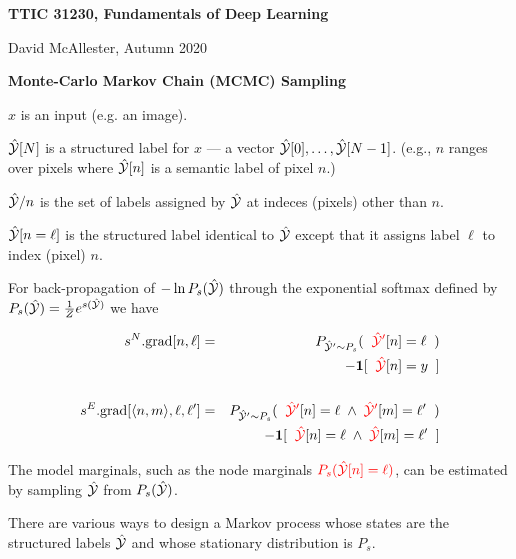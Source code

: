 




{\Huge

  \centerline{\bf TTIC 31230, Fundamentals of Deep Learning}
  \bigskip
  \centerline{David McAllester, Autumn 2020}
  \vfill
  \vfill
  \centerline{\bf Monte-Carlo Markov Chain (MCMC) Sampling}
\vfill
\vfill
\vfill


$x$ is an input (e.g. an image).

\vfill
$\hat{\cal Y} [N]$ is a structured label for $x$ --- a vector $\hat{\cal Y}[0],\ldots,\hat{\cal Y}[N-1]$. (e.g., $n$ ranges over pixels where $\hat{\cal Y}[n]$ is a semantic label of pixel $n$.)

\vfill
$\hat{\cal Y}/n$ is the set of labels assigned by $\hat{\cal Y}$ at indeces (pixels) other than $n$.

\vfill
$\hat{\cal Y}[n=\ell]$ is the structured label identical to $\hat{\cal Y}$ except that it assigns label $\ell$ to index (pixel) $n$.


For back-propagation of $- \ln P_s(\hat{\cal Y})$ through the exponential softmax defined by $P_s(\hat{\cal Y}) = \frac{1}{Z} e^{s(\hat{\cal Y})}$ we have

\vfill
\begin{eqnarray*}
    s^N.\mathrm{grad}[n,\ell] & = &   P_{\hat{\cal Y}' \sim P_s}(\;\;{\color{red} \hat{\cal Y}'}[n] = \ell\;\;) \\
    & & - \mathbf{1}[\;\;{\color{red} \hat{\cal Y}}[n] = y\;\;] \\
    \\
    s^E.\mathrm{grad}[{\mbox{$\langle n,m\rangle$}},\ell,\ell'] & = &  P_{\hat{\cal Y}' \sim P_s}(\;\;{\color{red} \hat{\cal Y}'}[n] = \ell \; \wedge \; {\color{red} \hat{\cal Y}'}[m] = \ell'\;\;) \\
    & & - \mathbf{1}[\;\;{\color{red} \hat{\cal Y}}[n] = \ell\; \wedge \; {\color{red} \hat{\cal Y}}[m] = \ell'\;\;]
\end{eqnarray*}

The model marginals, such as the node marginals
 ${\color{red} P_s(\hat{\cal Y}[n]=\ell)}$, can be estimated by sampling $\hat{\cal Y}$ from $P_s(\hat{\cal Y})$.

\vfill
There are various ways to design a Markov process whose states are the structured labels $\hat{\cal Y}$ and whose stationary distribution is $P_s$.

}
